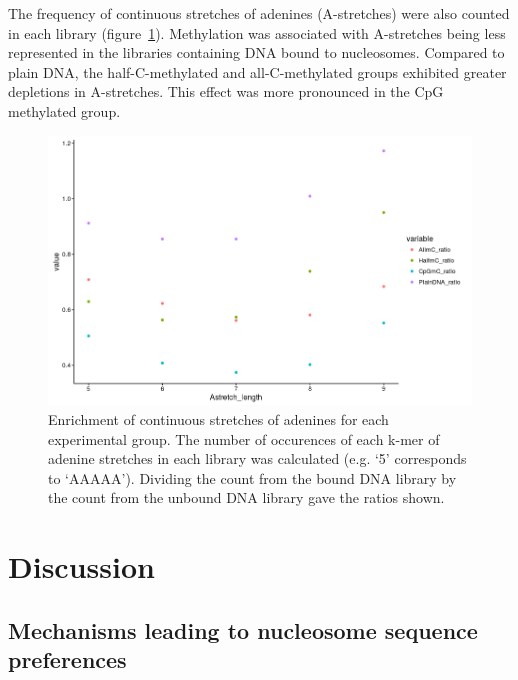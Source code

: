 \documentclass[parskip=full, numbers=noenddot]{scrreprt}
\begin{document}
The frequency of continuous stretches of adenines (A-stretches) were also counted in each library (figure~\ref{fig:astretch}).  Methylation was associated with A-stretches being less represented in the libraries containing DNA bound to nucleosomes.  Compared to plain DNA, the half-C-methylated and all-C-methylated groups exhibited greater depletions in A-stretches.  This effect was more pronounced in the CpG methylated group.

\begin{figure}[htpb]
  \centering
  \includegraphics[width=\textwidth]{astretch}
  \caption{Enrichment of continuous stretches of adenines for each experimental group.  The number of occurences of each k-mer of adenine stretches in each library was calculated (e.g. `5' corresponds to `AAAAA').  Dividing the count from the bound DNA library by the count from the unbound DNA library gave the ratios shown.}
  \label{fig:astretch}
\end{figure}

\section{Discussion}
\label{sec:emsaselex_discussion}


\subsection{Mechanisms leading to nucleosome sequence preferences}
\label{ssec:emsaselex_discussion_seqpref}
\end{document}
